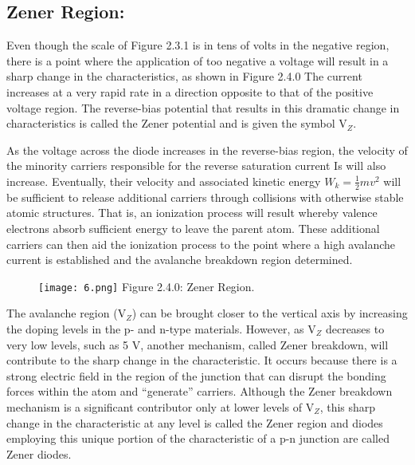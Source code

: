 \documentclass[10pt,a4paper]{article}
\begin{document}
\pagebreak

\subsection{Zener Region:}

Even though the scale of Figure 2.3.1 is in tens of volts in the negative region, there is a point where the application of too negative a voltage will result in a sharp change in the characteristics, as shown in Figure 2.4.0 The current increases at a very rapid rate in a direction opposite to that of the positive voltage region. The reverse-bias potential that results in this dramatic change in characteristics is called the Zener potential and is given the symbol V$_{Z}$. \hfill \break 

As the voltage across the diode increases in the reverse-bias region, the velocity of the minority carriers responsible for the reverse saturation current Is will also increase. Eventually, their velocity and associated kinetic energy $W_{k} = \frac{1}{2} mv^2 $ will be sufficient to release additional carriers through collisions with otherwise stable atomic structures. That is, an ionization process will result whereby valence electrons absorb sufficient energy to leave the parent atom. These additional carriers can then aid the ionization process to the point where a high avalanche current is established and the avalanche breakdown region determined.

\begin{figure}[H]
\texttt{[image: 6.png]}
\centering \linebreak \linebreak Figure 2.4.0: Zener Region.
\end{figure}

The avalanche region (V$_{Z}$) can be brought closer to the vertical axis by increasing the doping levels in the p- and n-type materials. However, as V$_{Z}$ decreases to very low levels, such as  5 V, another mechanism, called Zener breakdown, will contribute to the sharp change in the characteristic. It occurs because there is a strong electric field in the region of the junction that can disrupt the bonding forces within the atom and “generate” carriers. Although the Zener breakdown mechanism is a significant contributor only at lower levels of V$_{Z}$, this sharp change in the characteristic at any level is called the Zener region and diodes employing this unique portion of the characteristic of a p-n junction are called Zener diodes. \hfill \break
\end{document}
